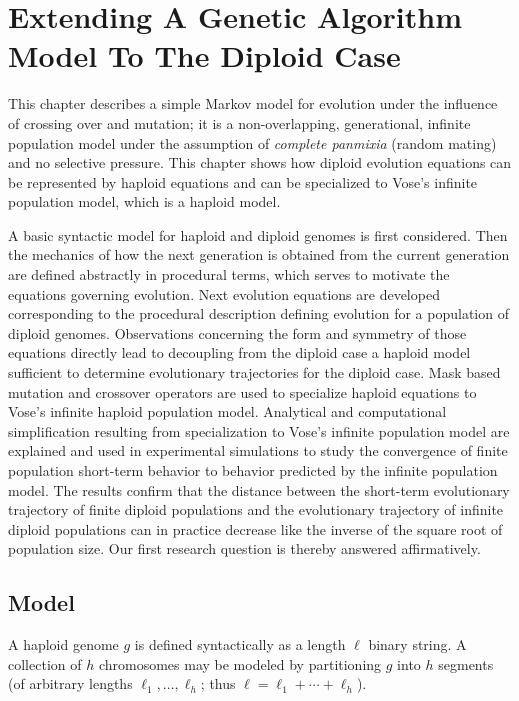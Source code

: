 \chapter{Extending A Genetic Algorithm Model To The Diploid Case} \label{ch:GA model Diploid}
This chapter describes a simple Markov model for evolution under the
influence of crossing over and mutation; it is a non-overlapping,
generational, infinite population model under the assumption of {\em complete panmixia} (random mating) and no
selective pressure. This chapter shows how diploid evolution equations can be represented by haploid equations 
and can be specialized to Vose's infinite population model, which is a haploid model.

A basic syntactic model for haploid and diploid genomes is first considered. 
Then the mechanics of how the next generation is obtained from the current generation are
defined abstractly in procedural terms, which serves to motivate the equations governing evolution. 
Next evolution equations are developed corresponding to the
procedural description defining evolution for a population of
diploid genomes. Observations concerning the form and symmetry of
those equations directly lead to decoupling from the diploid case a
haploid model sufficient to determine evolutionary trajectories for
the diploid case. Mask based mutation and crossover operators are used to specialize 
haploid equations to Vose's infinite haploid population model. 
Analytical and computational simplification resulting from specialization to 
Vose's infinite population model are explained and used 
in experimental simulations to study the convergence of finite population 
short-term behavior to behavior predicted by the infinite population model.    
The results confirm that the distance between the short-term
evolutionary trajectory of finite diploid populations and the
evolutionary trajectory of infinite diploid populations can in
practice decrease like the inverse of the square root of population
size.  Our first research question is thereby answered
affirmatively.

\section{Model} \label{Model}
A haploid genome $g$ is defined syntactically as a length $\ell$
binary string.  A collection of $h$ chromosomes may be modeled by
partitioning $g$ into $h$ segments (of arbitrary lengths $\ell_1,
\ldots , \ell_h$; thus $\ell = \ell_1 + \cdots + \ell_h$).

